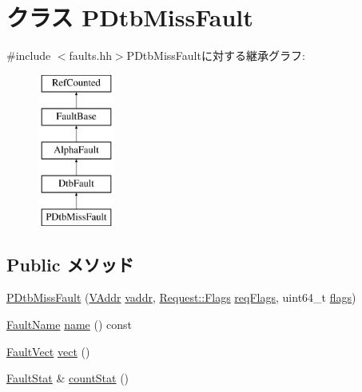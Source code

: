 \hypertarget{classAlphaISA_1_1PDtbMissFault}{
\section{クラス PDtbMissFault}
\label{classAlphaISA_1_1PDtbMissFault}
}


{\ttfamily \#include $<$faults.hh$>$}PDtbMissFaultに対する継承グラフ:\begin{figure}[H]
\begin{center}
\leavevmode
\includegraphics[height=5cm]{classAlphaISA_1_1PDtbMissFault}
\end{center}
\end{figure}
\subsection*{Public メソッド}
\begin{DoxyCompactItemize}
\item 
\hyperlink{classAlphaISA_1_1PDtbMissFault_add01ee5fb640342c0f65f9b3b79199ba}{PDtbMissFault} (\hyperlink{structAlphaISA_1_1VAddr}{VAddr} \hyperlink{classAlphaISA_1_1DtbFault_a48d5190e0fd672e7fe9d248a670b8ea3}{vaddr}, \hyperlink{classFlags}{Request::Flags} \hyperlink{classAlphaISA_1_1DtbFault_a4342a385c094b40ed46b0674fbb0b223}{reqFlags}, uint64\_\-t \hyperlink{classAlphaISA_1_1DtbFault_a899a76dc5f03f0d4ea3793c339e07ee9}{flags})
\item 
\hyperlink{sim_2faults_8hh_abb196df64725e5c2568c900cf130d8d7}{FaultName} \hyperlink{classAlphaISA_1_1PDtbMissFault_a73adb23259baf912a81683a9790a303f}{name} () const 
\item 
\hyperlink{classm5_1_1params_1_1Addr}{FaultVect} \hyperlink{classAlphaISA_1_1PDtbMissFault_ae15c5d7ab0162821b93d668d0b225198}{vect} ()
\item 
\hyperlink{classStats_1_1Scalar}{FaultStat} \& \hyperlink{classAlphaISA_1_1PDtbMissFault_a6c79663c761ff57265459f7e3aefaf4c}{countStat} ()
\end{DoxyCompactItemize}
